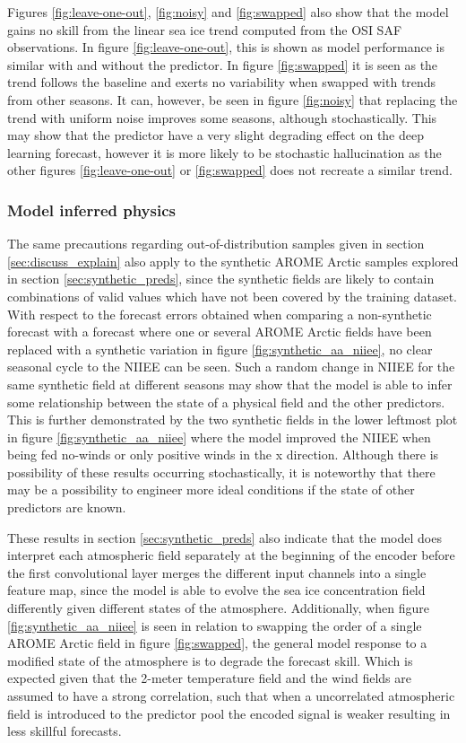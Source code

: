 \documentclass[../main/thesis]{subfiles}
\begin{document}
Figures \ref{fig:leave-one-out}, \ref{fig:noisy} and \ref{fig:swapped} also show that the model gains no skill from the linear sea ice trend computed from the OSI SAF observations. In figure \ref{fig:leave-one-out}, this is shown as model performance is similar with and without the predictor. In figure \ref{fig:swapped} it is seen as the trend follows the baseline and exerts no variability when swapped with trends from other seasons. It can, however, be seen in figure \ref{fig:noisy} that replacing the trend with uniform noise improves some seasons, although stochastically. This may show that the predictor have a very slight degrading effect on the deep learning forecast, however it is more likely to be stochastic hallucination as the other figures \ref{fig:leave-one-out} or \ref{fig:swapped} does not recreate a similar trend.

\subsubsection{Model inferred physics}
\label{sec:discuss_model_inferred_phys}
The same precautions regarding out-of-distribution samples given in section \ref{sec:discuss_explain} also apply to the synthetic AROME Arctic samples explored in section \ref{sec:synthetic_preds}, since the synthetic fields are likely to contain combinations of valid values which have not been covered by the training dataset. With respect to the forecast errors obtained when comparing a non-synthetic forecast with a forecast where one or several AROME Arctic fields have been replaced with a synthetic variation in figure \ref{fig:synthetic_aa_niiee}, no clear seasonal cycle to the NIIEE can be seen. Such a random change in NIIEE for the same synthetic field at different seasons may show that the model is able to infer some relationship between the state of a physical field and the other predictors. This is further demonstrated by the two synthetic fields in the lower leftmost plot in figure \ref{fig:synthetic_aa_niiee} where the model improved the NIIEE when being fed no-winds or only positive winds in the x direction. Although there is possibility of these results occurring stochastically, it is noteworthy that there may be a possibility to engineer more ideal conditions if the state of other predictors are known.

These results in section \ref{sec:synthetic_preds} also indicate that the model does interpret each atmospheric field separately at the beginning of the encoder before the first convolutional layer merges the different input channels into a single feature map, since the model is able to evolve the sea ice concentration field differently given different states of the atmosphere. Additionally, when figure \ref{fig:synthetic_aa_niiee} is seen in relation to swapping the order of a single AROME Arctic field in figure \ref{fig:swapped}, the general model response to a modified state of the atmosphere is to degrade the forecast skill. Which is expected given that the 2-meter temperature field and the wind fields are assumed to have a strong correlation, such that when a uncorrelated atmospheric field is introduced to the predictor pool the encoded signal is weaker resulting in less skillful forecasts.
\end{document}
